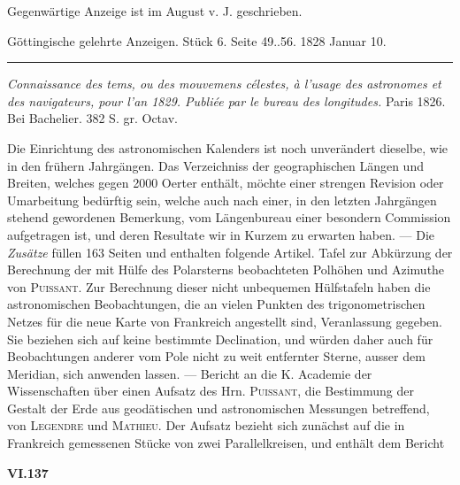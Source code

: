 \par\medskip
\hypertarget{native-650-lower}{}
\expandafter\def\csname HistoricalNoteText37\endcsname{Gegenwärtige Anzeige ist im August v. J. geschrieben.}
\begin{center}\small Göttingische gelehrte Anzeigen. Stück 6. Seite 49..56. 1828 Januar 10.\\[3pt]\rule{.72\linewidth}{.3pt}\end{center}

\emph{Connaissance des tems, ou des mouvemens célestes, à l'usage des astronomes et des navigateurs, pour l'an \textup{1829}. Publiée par le bureau des longitudes.} Paris 1826. Bei Bachelier. 382 S. gr. Octav. 

Die Einrichtung des astronomischen Kalenders ist noch unverändert dieselbe, wie in den frühern Jahrgängen. Das Verzeichniss der geographischen Längen und Breiten, welches gegen 2000 Oerter enthält, möchte einer strengen Revision oder Umarbeitung bedürftig sein, welche auch nach einer, in den letzten Jahrgängen stehend gewordenen Bemerkung, vom Längenbureau einer besondern Commission aufgetragen ist, und deren Resultate wir in Kurzem zu erwarten haben. --- Die \emph{Zusätze} füllen 163 Seiten und enthalten folgende Artikel. Tafel zur Abkürzung der Berechnung der mit Hülfe des Polarsterns beobachteten Polhöhen und Azimuthe von \textsc{Puissant}. Zur Berechnung dieser nicht unbequemen Hülfstafeln haben die astronomischen Beobachtungen, die an vielen Punkten des trigonometrischen Netzes für die neue Karte von Frankreich angestellt sind, Veranlassung gegeben. Sie beziehen sich auf keine bestimmte Declination, und würden daher auch für Beobachtungen anderer vom Pole nicht zu weit entfernter Sterne, ausser dem Meridian, sich anwenden lassen. --- Bericht an die K. Academie der Wissenschaften über einen Aufsatz des Hrn. \textsc{Puissant}, die Bestimmung der Gestalt der Erde aus geodätischen und astronomischen Messungen betreffend, von \textsc{Legendre} und \textsc{Mathieu}. Der Aufsatz bezieht sich zunächst auf die in Frankreich gemessenen Stücke von zwei Parallelkreisen, und enthält dem Bericht \par\vfill\noindent\textbf{VI.}\hfill\textbf{137}\hspace*{.17\linewidth}\par
\par\clearpage\thispagestyle{empty}
\fancyhead[L]{}
